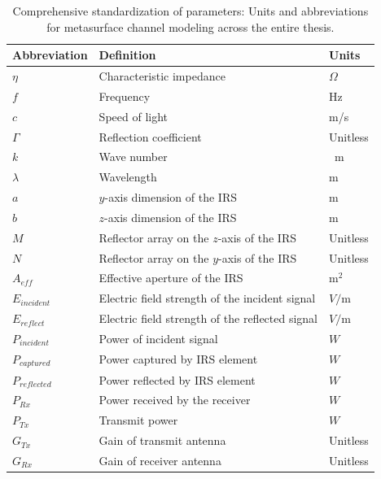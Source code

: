 \begin{table}[H] %
	\footnotesize
	\caption{Comprehensive standardization of parameters: Units and abbreviations for metasurface channel modeling across the entire thesis.}
	\label{Variable abbreviation}
	\centering
	\begin{tabular}{C{3cm}|C{7cm}|C{2.5cm}}
		\textbf{Abbreviation} & \bf Definition & \bf Units\\
		\hline 
		$\eta$ & Characteristic impedance & $\Omega$\\
		\hline 
		$f$ & Frequency & \si{\hertz} \\
		\hline 
		$c$ & Speed of light & \si{\meter}/\si{\second} \\
		\hline
		$\Gamma$ & Reflection coefficient & Unitless\\
		\hline 
		$k$ & Wave number & \si{\per\meter}\\
		\hline
		$\lambda$ & Wavelength & \si{\meter}\\
		\hline 
		$a$  & $y$-axis dimension of the \ac{IRS} & \si{\meter} \\
		\hline 
		$b$  & $z$-axis dimension of the \ac{IRS} & \si{\meter} \\
		\hline 
		$M$  & Reflector array on the $z$-axis of the \ac{IRS} & Unitless \\
		\hline 
		$N$  & Reflector array on the $y$-axis of the \ac{IRS} & Unitless \\
		\hline 
		$A_{eff}$ & Effective aperture of the \ac{IRS}  & $\si{\meter}^2$\\
		\hline 
		$ E_{incident}$  & Electric field strength of the incident signal & $V/\si{\meter}$\\
		\hline 
		$ E_{reflect}$  & Electric field strength of the reflected signal & $V/\si{\meter}$\\
		\hline 
		$P_{incident}$ & Power of incident signal & $W$ \\
		\hline 
		$ P_{captured}$ & Power captured by \ac{IRS} element & $W$  \\
		\hline 
		$ P_{reflected}$ & Power reflected by \ac{IRS} element & $W$  \\
		\hline 
		$P_{Rx}$ & Power received by the receiver & $W$ \\
		\hline 
		$ P_{Tx} $  & Transmit power & $W$ \\
		\hline 
		$G_{Tx} $ & Gain of transmit antenna & Unitless\\
		\hline 
		$G_{Rx} $ & Gain of receiver antenna & Unitless\\

\end{tabular}
\end{table}
